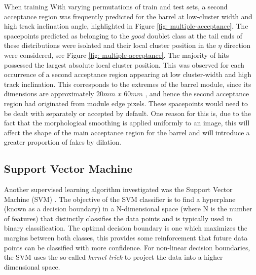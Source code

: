 When training With varying permutations of train and test sets, a second acceptance region was frequently predicted for the barrel at low-cluster width and high track inclination angle, highlighted in Figure \ref{fig: multiple-acceptance}. The spacepoints predicted as belonging to the $good$ doublet class at the tail ends of these distributions were isolated and their local cluster position in the $\eta$ direction were considered, see Figure \ref{fig: multiple-acceptance}. The majority of hits possessed the largest absolute local cluster position. This was observed for each occurrence of a second acceptance region appearing at low cluster-width and high track inclination. This corresponds to the extremes of the barrel module, since its dimensions are approximately $20mm$ $x$ $60mm$ \cite{pixel-module-dimensions}, and hence the second acceptance region had originated from module edge pixels. These spacepoints would need to be dealt with separately or accepted by default. One reason for this is, due to the fact that the morphological smoothing is applied uniformly to an image, this will affect the shape of the main acceptance region for the barrel and will introduce a greater proportion of fakes by dilation.
    

\subsection{Support Vector Machine}



Another supervised learning algorithm investigated was the Support Vector Machine (SVM) \cite{svm}. The objective of the SVM classifier is to find a hyperplane (known as a decision boundary) in a N-dimensional space (where N is the number of features) that distinctly classifies the data points and is typically used in binary classification. The optimal decision boundary is one which maximizes the margins between both classes, this provides some reinforcement that future data points can be classified with more confidence. For non-linear decision boundaries, the SVM uses the so-called \textit{kernel trick} to project the data into a higher dimensional space. 

